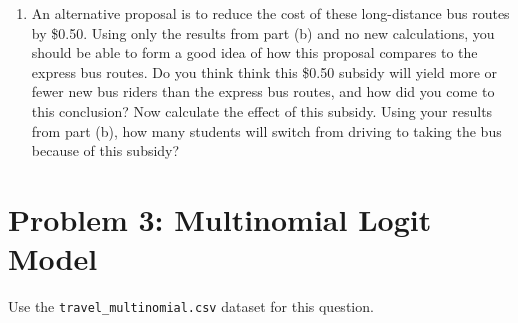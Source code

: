 \documentclass[11pt,letterpaper]{article}
\begin{document}
\begin{enumerate}[label=\alph*., leftmargin=*]
	\item An alternative proposal is to reduce the cost of these long-distance bus routes by \$0.50. Using only the results from part (b) and no new calculations, you should be able to form a good idea of how this proposal compares to the express bus routes. Do you think think this \$0.50 subsidy will yield more or fewer new bus riders than the express bus routes, and how did you come to this conclusion? Now calculate the effect of this subsidy. Using your results from part (b), how many students will switch from driving to taking the bus because of this subsidy?
\end{enumerate}

\section*{Problem 3: Multinomial Logit Model}

Use the \texttt{travel\_multinomial.csv} dataset for this question.
\end{document}
